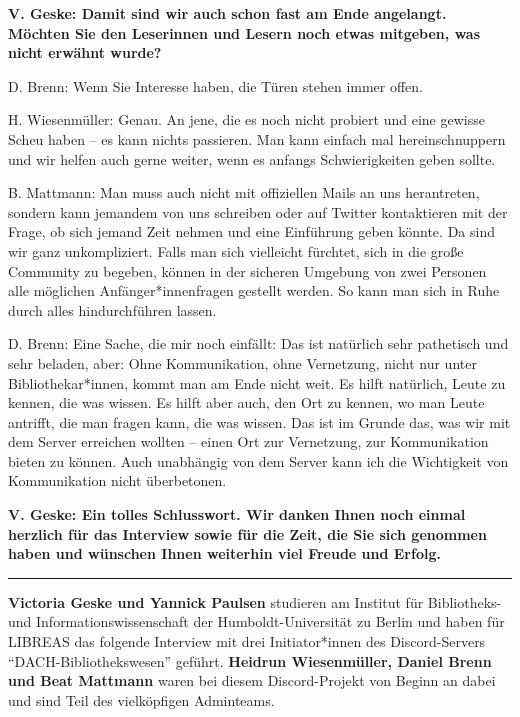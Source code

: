 \documentclass[a4paper,
fontsize=11pt,
oneside,
numbers=noperiodatend,
parskip=half-,
bibliography=totoc,
final
]{scrartcl}
\begin{document}
\textbf{V. Geske: Damit sind wir auch schon fast am Ende angelangt.
Möchten Sie den Leserinnen und Lesern noch etwas mitgeben, was nicht
erwähnt wurde?}

D. Brenn: Wenn Sie Interesse haben, die Türen stehen immer offen.

H. Wiesenmüller: Genau. An jene, die es noch nicht probiert und eine
gewisse Scheu haben -- es kann nichts passieren. Man kann einfach mal
hereinschnuppern und wir helfen auch gerne weiter, wenn es anfangs
Schwierigkeiten geben sollte.

B. Mattmann: Man muss auch nicht mit offiziellen Mails an uns
herantreten, sondern kann jemandem von uns schreiben oder auf Twitter
kontaktieren mit der Frage, ob sich jemand Zeit nehmen und eine
Einführung geben könnte. Da sind wir ganz unkompliziert. Falls man sich
vielleicht fürchtet, sich in die große Community zu begeben, können in
der sicheren Umgebung von zwei Personen alle möglichen Anfänger*innenfragen
gestellt werden. So kann man sich in Ruhe durch alles hindurchführen
lassen.

D. Brenn: Eine Sache, die mir noch einfällt: Das ist natürlich sehr
pathetisch und sehr beladen, aber: Ohne Kommunikation, ohne Vernetzung,
nicht nur unter Bibliothekar*innen, kommt man am Ende nicht weit. Es
hilft natürlich, Leute zu kennen, die was wissen. Es hilft aber auch,
den Ort zu kennen, wo man Leute antrifft, die man fragen kann, die was
wissen. Das ist im Grunde das, was wir mit dem Server erreichen wollten
-- einen Ort zur Vernetzung, zur Kommunikation bieten zu können. Auch
unabhängig von dem Server kann ich die Wichtigkeit von Kommunikation
nicht überbetonen.

\textbf{V. Geske: Ein tolles Schlusswort. Wir danken Ihnen noch einmal
herzlich für das Interview sowie für die Zeit, die Sie sich genommen
haben und wünschen Ihnen weiterhin viel Freude und Erfolg.}

\begin{center}\rule{0.5\linewidth}{0.5pt}\end{center}

\textbf{Victoria Geske und Yannick Paulsen}  studieren am
Institut für Bibliotheks- und Informationswissenschaft der
Humboldt-Universität zu Berlin und haben für LIBREAS das folgende
Interview mit drei Initiator*innen des Discord-Servers
``DACH-Bibliothekswesen'' geführt. \textbf{Heidrun Wiesenmüller, Daniel Brenn
und Beat Mattmann} waren bei diesem Discord-Projekt von Beginn an dabei
und sind Teil des vielköpfigen Adminteams.
\end{document}
